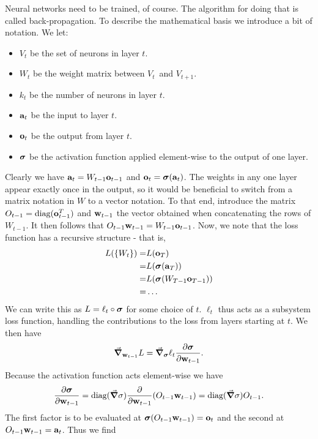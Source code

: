 Neural networks need to be trained, of course. The algorithm for doing that is called back-propagation. To describe the mathematical basis we introduce a bit of notation. We let:
\begin{itemize}
	\item $V_{t}$ be the set of neurons in layer $t$.
	\item $W_{t}$ be the weight matrix between $V_{t}$ and $V_{t + 1}$.
	\item $k_{t}$ be the number of neurons in layer $t$.
	\item $\vb{a}_{t}$ be the input to layer $t$.
	\item $\vb{o}_{t}$ be the output from layer $t$.
	\item $\vb*{\sigma}$ be the activation function applied element-wise to the output of one layer.
\end{itemize}
Clearly we have $\vb{a}_{t} = W_{t - 1}\vb{o}_{t - 1}$ and $\vb{o}_{t} = \vb*{\sigma}(\vb{a}_{t})$. The weights in any one layer appear exactly once in the output, so it would be beneficial to switch from a matrix notation in $W$ to a vector notation. To that end, introduce the matrix $O_{t - 1} = \text{diag}(\vb{o}_{t - 1}^{T})$ and $\vb{w}_{t - 1}$ the vector obtained when concatenating the rows of $W_{t - 1}$. It then follows that $O_{t - 1}\vb{w}_{t - 1} = W_{t - 1}\vb{o}_{t - 1}$. Now, we note that the loss function has a recursive structure - that is,
\begin{align*}
	L(\{W_{t}\}) =& L(\vb{o}_{T}) \\
	             =& L(\vb*{\sigma}(\vb{a}_{T})) \\
	             =& L(\vb*{\sigma}(W_{T - 1}\vb{o}_{T - 1})) \\
	             =& \dots
\end{align*}
We can write this as $L = \ell_{t}\circ \vb*{\sigma}$ for some choice of $t$. $\ell_{t}$ thus acts as a subsystem loss function, handling the contributions to the loss from layers starting at $t$. We then have
\begin{align*}
	\grad_{\vb{w}_{t - 1}}L = \grad_{\vb*{\sigma}}\ell_{t}\pdv{\vb*{\sigma}}{\vb{w}_{t - 1}}.
\end{align*}
Because the activation function acts element-wise we have
\begin{align*}
	\pdv{\vb*{\sigma}}{\vb{w}_{t - 1}} = \text{diag}(\grad\sigma)\pdv{\vb{w}_{t - 1}}(O_{t - 1}\vb{w}_{t - 1}) = \text{diag}(\grad\sigma)O_{t - 1}.
\end{align*}
The first factor is to be evaluated at $\vb*{\sigma}(O_{t - 1}\vb{w}_{t - 1}) = \vb{o}_{t}$ and the second at $O_{t - 1}\vb{w}_{t - 1} = \vb{a}_{t}$. Thus we find
